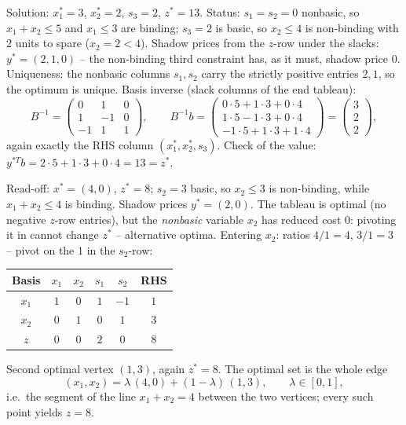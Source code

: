 \begin{solutions}
  \item Solution: $x_{1}^{*}=3$, $x_{2}^{*}=2$, $s_{3}=2$, $z^{*}=13$.
        Status: $s_{1}=s_{2}=0$ nonbasic, so $x_{1}+x_{2}\le 5$ and
        $x_{1}\le 3$ are binding; $s_{3}=2$ is basic, so $x_{2}\le 4$ is
        non-binding with $2$ units to spare ($x_{2}=2<4$). Shadow prices
        from the $z$-row under the slacks: $y^{*}=(2,1,0)$ -- the
        non-binding third constraint has, as it must, shadow price $0$.
        Uniqueness: the nonbasic columns $s_{1},s_{2}$ carry the strictly
        positive entries $2,1$, so the optimum is unique. Basis inverse
        (slack columns of the end tableau):
        \[
          B^{-1}=
          \begin{pmatrix}
            0 & 1 & 0\\
            1 & -1 & 0\\
            -1 & 1 & 1
          \end{pmatrix},
          \qquad
          B^{-1}b=
          \begin{pmatrix}
            0\cdot 5+1\cdot 3+0\cdot 4\\
            1\cdot 5-1\cdot 3+0\cdot 4\\
            -1\cdot 5+1\cdot 3+1\cdot 4
          \end{pmatrix}
          =\begin{pmatrix}3\\2\\2\end{pmatrix},
        \]
        again exactly the RHS column $(x_{1}^{*},x_{2}^{*},s_{3})$. Check
        of the value: $y^{*T}b=2\cdot 5+1\cdot 3+0\cdot 4=13=z^{*}$.

  \item Read-off: $x^{*}=(4,0)$, $z^{*}=8$; $s_{2}=3$ basic, so
        $x_{2}\le 3$ is non-binding, while $x_{1}+x_{2}\le 4$ is binding.
        Shadow prices $y^{*}=(2,0)$. The tableau is optimal (no negative
        $z$-row entries), but the \emph{nonbasic} variable $x_{2}$ has
        reduced cost $0$: pivoting it in cannot change $z^{*}$ --
        alternative optima. Entering $x_{2}$: ratios $4/1=4$, $3/1=3$ --
        pivot on the $1$ in the $s_{2}$-row:
        \begin{center}
        \begin{tabular}{c|cccc|c}
        Basis & $x_{1}$ & $x_{2}$ & $s_{1}$ & $s_{2}$ & RHS\\
        \hline
        $x_{1}$ & $1$ & $0$ & $1$ & $-1$ & $1$\\
        $x_{2}$ & $0$ & $1$ & $0$ & $1$ & $3$\\
        \hline
        $z$ & $0$ & $0$ & $2$ & $0$ & $8$\\
        \end{tabular}
        \end{center}
        Second optimal vertex $(1,3)$, again $z^{*}=8$. The optimal set is
        the whole edge
        \[
          (x_{1},x_{2})=\lambda\,(4,0)+(1-\lambda)\,(1,3),
          \qquad \lambda\in[0,1],
        \]
        i.e.\ the segment of the line $x_{1}+x_{2}=4$ between the two
        vertices; every such point yields $z=8$.


\end{solutions}
